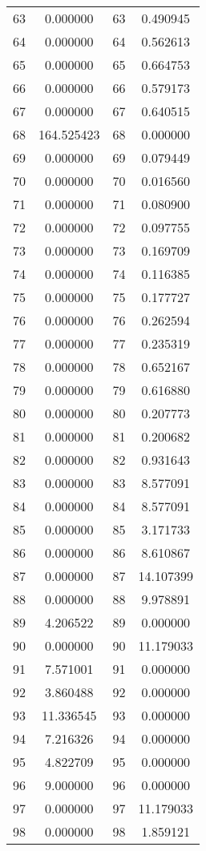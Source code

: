 \documentclass[12pt]{article}
\begin{document}
\begin{longtable}{@{}cccc@{}}
63 & 0.000000 & 63 & 0.490945 \\
64 & 0.000000 & 64 & 0.562613 \\
65 & 0.000000 & 65 & 0.664753 \\
66 & 0.000000 & 66 & 0.579173 \\
67 & 0.000000 & 67 & 0.640515 \\
68 & 164.525423 & 68 & 0.000000 \\
69 & 0.000000 & 69 & 0.079449 \\
70 & 0.000000 & 70 & 0.016560 \\
71 & 0.000000 & 71 & 0.080900 \\
72 & 0.000000 & 72 & 0.097755 \\
73 & 0.000000 & 73 & 0.169709 \\
74 & 0.000000 & 74 & 0.116385 \\
75 & 0.000000 & 75 & 0.177727 \\
76 & 0.000000 & 76 & 0.262594 \\
77 & 0.000000 & 77 & 0.235319 \\
78 & 0.000000 & 78 & 0.652167 \\
79 & 0.000000 & 79 & 0.616880 \\
80 & 0.000000 & 80 & 0.207773 \\
81 & 0.000000 & 81 & 0.200682 \\
82 & 0.000000 & 82 & 0.931643 \\
83 & 0.000000 & 83 & 8.577091 \\
84 & 0.000000 & 84 & 8.577091 \\
85 & 0.000000 & 85 & 3.171733 \\
86 & 0.000000 & 86 & 8.610867 \\
87 & 0.000000 & 87 & 14.107399 \\
88 & 0.000000 & 88 & 9.978891 \\
89 & 4.206522 & 89 & 0.000000 \\
90 & 0.000000 & 90 & 11.179033 \\
91 & 7.571001 & 91 & 0.000000 \\
92 & 3.860488 & 92 & 0.000000 \\
93 & 11.336545 & 93 & 0.000000 \\
94 & 7.216326 & 94 & 0.000000 \\
95 & 4.822709 & 95 & 0.000000 \\
96 & 9.000000 & 96 & 0.000000 \\
97 & 0.000000 & 97 & 11.179033 \\
98 & 0.000000 & 98 & 1.859121 \\

\end{longtable}
\end{document}
